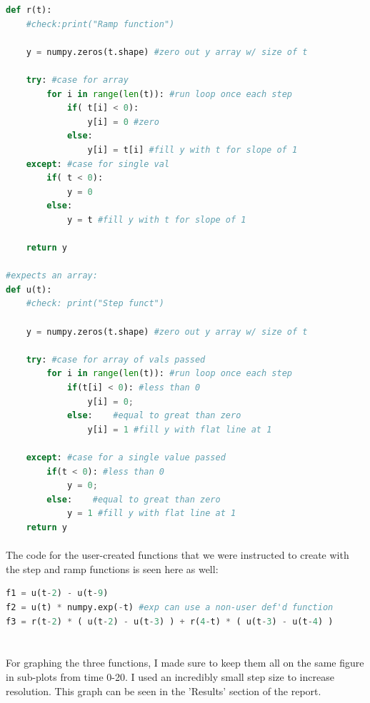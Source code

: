 \documentclass[12pt]{report}
\begin{document}
    \begin{lstlisting}[language=Python] 
def r(t):
    #check:print("Ramp function")
    
    y = numpy.zeros(t.shape) #zero out y array w/ size of t
    
    try: #case for array
        for i in range(len(t)): #run loop once each step
            if( t[i] < 0):
                y[i] = 0 #zero
            else:
                y[i] = t[i] #fill y with t for slope of 1
    except: #case for single val
        if( t < 0):
            y = 0
        else:
            y = t #fill y with t for slope of 1    
    
    return y

#expects an array:
def u(t): 
    #check: print("Step funct")
    
    y = numpy.zeros(t.shape) #zero out y array w/ size of t

    try: #case for array of vals passed
        for i in range(len(t)): #run loop once each step
            if(t[i] < 0): #less than 0
                y[i] = 0;
            else:    #equal to great than zero
                y[i] = 1 #fill y with flat line at 1
    
    except: #case for a single value passed
        if(t < 0): #less than 0
            y = 0;
        else:    #equal to great than zero
            y = 1 #fill y with flat line at 1
    return y

    \end{lstlisting}

    \paragraph{} The code for the user-created functions that we were instructed to create with the step and ramp functions is seen here as well:

    \begin{lstlisting}[language=Python]
f1 = u(t-2) - u(t-9)
f2 = u(t) * numpy.exp(-t) #exp can use a non-user def'd function
f3 = r(t-2) * ( u(t-2) - u(t-3) ) + r(4-t) * ( u(t-3) - u(t-4) )
    
    \end{lstlisting}    
    
    \paragraph{} For graphing the three functions, I made sure to keep them all on the same figure in sub-plots from time 0-20. I used an incredibly small step size to increase resolution. This graph can be seen in the 'Results' section of the report. 
\end{document}
